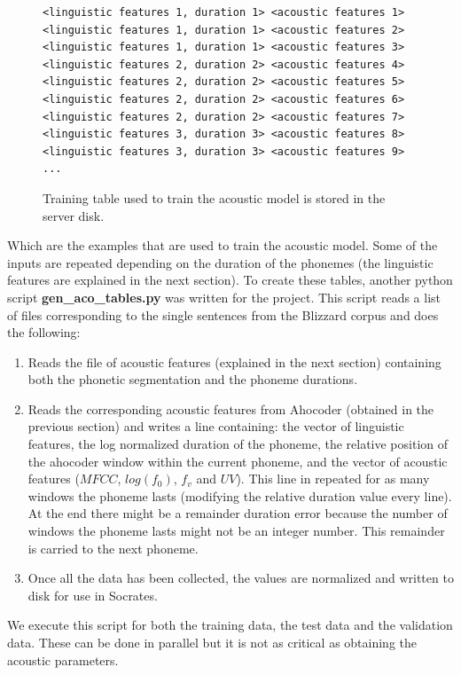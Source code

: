 \begin{figure}[h]
\begin{lstlisting}
<linguistic features 1, duration 1> <acoustic features 1>
<linguistic features 1, duration 1> <acoustic features 2>
<linguistic features 1, duration 1> <acoustic features 3>
<linguistic features 2, duration 2> <acoustic features 4>
<linguistic features 2, duration 2> <acoustic features 5>
<linguistic features 2, duration 2> <acoustic features 6>
<linguistic features 2, duration 2> <acoustic features 7>
<linguistic features 3, duration 3> <acoustic features 8>
<linguistic features 3, duration 3> <acoustic features 9>
...
\end{lstlisting}
\caption{Training table used to train the acoustic model is stored in the server disk.}
\end{figure}

Which are the examples that are used to train the acoustic model. Some of the inputs are repeated depending on the duration of the phonemes (the linguistic features are explained in the next section). To create these tables, another python script \textbf{gen\_aco\_tables.py} was written for the project. This script reads a list of files corresponding to the single sentences from the Blizzard corpus and does the following:
\begin{enumerate}
    \item Reads the file of acoustic features (explained in the next section) containing both the phonetic segmentation and the phoneme durations.
    \item Reads the corresponding acoustic features from Ahocoder (obtained in the previous section) and writes a line containing: the vector of linguistic features, the log normalized duration of the phoneme, the relative position of the ahocoder window within the current phoneme, and the vector of acoustic features ($MFCC$, $log(f_0)$, $f_v$ and $UV$). This line in repeated for as many windows the phoneme lasts (modifying the relative duration value every line). At the end there might be a remainder duration error because the number of windows the phoneme lasts might not be an integer number. This remainder is carried to the next phoneme.
    \item Once all the data has been collected, the values are normalized and written to disk for use in Socrates.
\end{enumerate}

We execute this script for both the training data, the test data and the validation data. These can be done in parallel but it is not as critical as obtaining the acoustic parameters.

